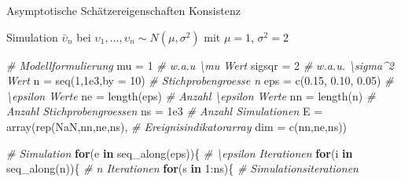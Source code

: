 \documentclass[
  8pt,
  ignorenonframetext,
]{beamer}
\newenvironment{Shaded}{\begin{snugshade}}{\end{snugshade}}
\newcommand{\AttributeTok}[1]{\textcolor[rgb]{0.77,0.63,0.00}{#1}}
\newcommand{\CommentTok}[1]{\textcolor[rgb]{0.56,0.35,0.01}{\textit{#1}}}
\newcommand{\ConstantTok}[1]{\textcolor[rgb]{0.00,0.00,0.00}{#1}}
\newcommand{\ControlFlowTok}[1]{\textcolor[rgb]{0.13,0.29,0.53}{\textbf{#1}}}
\newcommand{\DecValTok}[1]{\textcolor[rgb]{0.00,0.00,0.81}{#1}}
\newcommand{\FloatTok}[1]{\textcolor[rgb]{0.00,0.00,0.81}{#1}}
\newcommand{\FunctionTok}[1]{\textcolor[rgb]{0.00,0.00,0.00}{#1}}
\newcommand{\NormalTok}[1]{#1}
\newcommand{\OtherTok}[1]{\textcolor[rgb]{0.56,0.35,0.01}{#1}}
\newcommand{\SpecialCharTok}[1]{\textcolor[rgb]{0.00,0.00,0.00}{#1}}
\newcommand{\ups} {\upsilon}
\begin{document}
\begin{frame}[fragile]{\small Asymptotische Schätzereigenschaften
\textbar{} Konsistenz}
\protect\hypertarget{asymptotische-schuxe4tzereigenschaften-konsistenz-4}{}
\small

Simulation \(\bar{\ups}_n\) bei
\(\ups_1,...,\ups_n \sim N(\mu,\sigma^2)\) mit \(\mu = 1\),
\(\sigma^2 = 2\)

\footnotesize
{}
\vspace{1mm}

\begin{Shaded}
\begin{Highlighting}[]
\CommentTok{\# Modellformulierung}
\NormalTok{mu      }\OtherTok{=} \DecValTok{1}                                         \CommentTok{\# w.a.u \textbackslash{}mu Wert}
\NormalTok{sigsqr  }\OtherTok{=} \DecValTok{2}                                         \CommentTok{\# w.a.u. \textbackslash{}sigma\^{}2 Wert}
\NormalTok{n       }\OtherTok{=} \FunctionTok{seq}\NormalTok{(}\DecValTok{1}\NormalTok{,}\FloatTok{1e3}\NormalTok{,}\AttributeTok{by =} \DecValTok{10}\NormalTok{)                        }\CommentTok{\# Stichprobengroesse n}
\NormalTok{eps     }\OtherTok{=} \FunctionTok{c}\NormalTok{(}\FloatTok{0.15}\NormalTok{, }\FloatTok{0.10}\NormalTok{, }\FloatTok{0.05}\NormalTok{)                       }\CommentTok{\# \textbackslash{}epsilon Werte}
\NormalTok{ne      }\OtherTok{=} \FunctionTok{length}\NormalTok{(eps)                               }\CommentTok{\# Anzahl \textbackslash{}epsilon Werte}
\NormalTok{nn      }\OtherTok{=} \FunctionTok{length}\NormalTok{(n)                                 }\CommentTok{\# Anzahl Stichprobengroessen}
\NormalTok{ns      }\OtherTok{=} \FloatTok{1e3}                                       \CommentTok{\# Anzahl Simulationen}
\NormalTok{E       }\OtherTok{=} \FunctionTok{array}\NormalTok{(}\FunctionTok{rep}\NormalTok{(}\ConstantTok{NaN}\NormalTok{,nn,ne,ns),                  }\CommentTok{\# Ereignisindikatorarray}
                \AttributeTok{dim =} \FunctionTok{c}\NormalTok{(nn,ne,ns))}

\CommentTok{\# Simulation}
\ControlFlowTok{for}\NormalTok{(e }\ControlFlowTok{in} \FunctionTok{seq\_along}\NormalTok{(eps))\{                           }\CommentTok{\# \textbackslash{}epsilon Iterationen}
    \ControlFlowTok{for}\NormalTok{(i }\ControlFlowTok{in} \FunctionTok{seq\_along}\NormalTok{(n))\{                         }\CommentTok{\# n Iterationen}
        \ControlFlowTok{for}\NormalTok{(s }\ControlFlowTok{in} \DecValTok{1}\SpecialCharTok{:}\NormalTok{ns)\{                             }\CommentTok{\# Simulationsiterationen}


\end{Highlighting}
\end{Shaded}
\end{frame}
\end{document}
